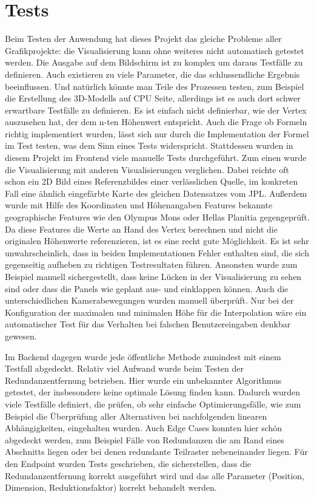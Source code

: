 \section{Tests}
Beim Testen der Anwendung hat dieses Projekt das gleiche Probleme aller Grafikprojekte: die Visualisierung kann ohne weiteres nicht automatisch getestet werden. Die Ausgabe auf dem Bildschirm ist zu komplex um daraus Testfälle zu definieren. Auch existieren zu viele Parameter, die das schlussendliche Ergebnis beeinflussen. Und natürlich könnte man Teile des Prozessen testen, zum Beispiel die Erstellung des 3D-Modells auf CPU Seite, allerdings ist es auch dort schwer erwartbare Testfälle zu definieren. Es ist einfach nicht definierbar, wie der Vertex auszusehen hat, der dem n-ten Höhenwert entspricht. Auch die Frage ob Formeln richtig implementiert wurden, lässt sich nur durch die Implementation der Formel im Test testen, was dem Sinn eines Tests widerspricht. Stattdessen wurden in diesem Projekt im Frontend viele manuelle Tests durchgeführt. Zum einen wurde die Visualisierung mit anderen Visualisierungen verglichen. Dabei reichte oft schon ein 2D Bild eines Referenzbildes einer verlässlichen Quelle, im konkreten Fall eine ähnlich eingefärbte Karte des gleichen Datensatzes vom JPL. Außerdem wurde mit Hilfe des Koordinaten und Höhenangaben Features bekannte geographische Features wie den Olympus Mons oder Hellas Planitia gegengeprüft. Da diese Features die Werte an Hand des Vertex berechnen und nicht die originalen Höhenwerte referenzieren, ist es eine recht gute Möglichkeit. Es ist sehr unwahrscheinlich, dass in beiden Implementationen Fehler enthalten sind, die sich gegenseitig aufheben zu richtigen Testresultaten führen. Ansonsten wurde zum Beispiel manuell sichergestellt, dass keine Lücken in der Visualisierung zu sehen sind oder dass die Panels wie geplant aus- und einklappen können. Auch die unterschiedlichen Kamerabewegungen wurden manuell überprüft. Nur bei der Konfiguration der maximalen und minimalen Höhe für die Interpolation wäre ein automatischer Test für das Verhalten bei falschen Benutzereingaben denkbar gewesen. 

Im Backend dagegen wurde jede öffentliche Methode zumindest mit einem Testfall abgedeckt. Relativ viel Aufwand wurde beim Testen der Redundanzentfernung betrieben. Hier wurde ein unbekannter Algorithmus getestet, der insbesondere keine optimale Lösung finden kann. Dadurch wurden viele Testfälle definiert, die prüfen, ob sehr einfache Optimierungsfälle, wie zum Beispiel die Überprüfung aller Alternativen bei nachfolgenden linearen Abhängigkeiten, eingehalten wurden. Auch Edge Cases konnten hier schön abgedeckt werden, zum Beispiel Fälle von Redundanzen die am Rand eines Abschnitts liegen oder bei denen redundante Teilraster nebeneinander liegen. Für den Endpoint wurden Tests geschrieben, die sicherstellen, dass die Redundanzentfernung korrekt ausgeführt wird und das alle Parameter (Position, Dimension, Reduktionsfaktor) korrekt behandelt werden.
